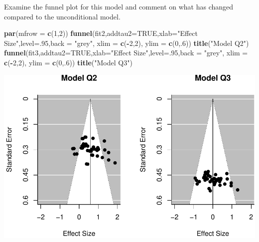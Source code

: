 \documentclass[]{article}
\newenvironment{Shaded}{\begin{snugshade}}{\end{snugshade}}
\newcommand{\KeywordTok}[1]{\textcolor[rgb]{0.13,0.29,0.53}{\textbf{#1}}}
\newcommand{\DataTypeTok}[1]{\textcolor[rgb]{0.13,0.29,0.53}{#1}}
\newcommand{\DecValTok}[1]{\textcolor[rgb]{0.00,0.00,0.81}{#1}}
\newcommand{\StringTok}[1]{\textcolor[rgb]{0.31,0.60,0.02}{#1}}
\newcommand{\OtherTok}[1]{\textcolor[rgb]{0.56,0.35,0.01}{#1}}
\newcommand{\OperatorTok}[1]{\textcolor[rgb]{0.81,0.36,0.00}{\textbf{#1}}}
\newcommand{\NormalTok}[1]{#1}
\begin{document}
Examine the funnel plot for this model and comment on what has changed
compared to the unconditional model.

\begin{Shaded}
\begin{Highlighting}[]
\KeywordTok{par}\NormalTok{(}\DataTypeTok{mfrow =} \KeywordTok{c}\NormalTok{(}\DecValTok{1}\NormalTok{,}\DecValTok{2}\NormalTok{))}
\KeywordTok{funnel}\NormalTok{(fit2,}\DataTypeTok{addtau2=}\OtherTok{TRUE}\NormalTok{,}\DataTypeTok{xlab=}\StringTok{"Effect Size"}\NormalTok{,}\DataTypeTok{level=}\NormalTok{.}\DecValTok{95}\NormalTok{,}\DataTypeTok{back =} \StringTok{"grey"}\NormalTok{, }\DataTypeTok{xlim =} \KeywordTok{c}\NormalTok{(}\OperatorTok{-}\DecValTok{2}\NormalTok{,}\DecValTok{2}\NormalTok{), }\DataTypeTok{ylim =} \KeywordTok{c}\NormalTok{(}\DecValTok{0}\NormalTok{,.}\DecValTok{6}\NormalTok{))}
\KeywordTok{title}\NormalTok{(}\StringTok{"Model Q2"}\NormalTok{)}
\KeywordTok{funnel}\NormalTok{(fit3,}\DataTypeTok{addtau2=}\OtherTok{TRUE}\NormalTok{,}\DataTypeTok{xlab=}\StringTok{"Effect Size"}\NormalTok{,}\DataTypeTok{level=}\NormalTok{.}\DecValTok{95}\NormalTok{,}\DataTypeTok{back =} \StringTok{"grey"}\NormalTok{, }\DataTypeTok{xlim =} \KeywordTok{c}\NormalTok{(}\OperatorTok{-}\DecValTok{2}\NormalTok{,}\DecValTok{2}\NormalTok{), }\DataTypeTok{ylim =} \KeywordTok{c}\NormalTok{(}\DecValTok{0}\NormalTok{,.}\DecValTok{6}\NormalTok{))}
\KeywordTok{title}\NormalTok{(}\StringTok{"Model Q3"}\NormalTok{)}
\end{Highlighting}
\end{Shaded}

\begin{center}\includegraphics{Beck_HW_9_files/figure-latex/unnamed-chunk-10-1} \end{center}
\end{document}
